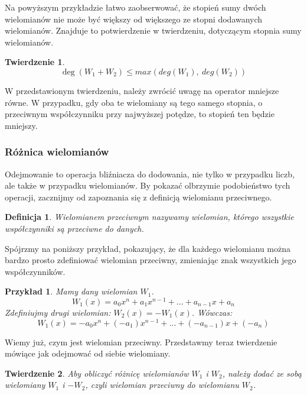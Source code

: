 \documentclass[twoside,a4paper]{book}
\newtheorem{theorem}{Twierdzenie}
\newtheorem{definition}{Definicja}
\newtheorem{example}{Przykład}
\begin{document}
Na powyższym przykładzie łatwo zaobserwować, że stopień sumy dwóch wielomianów nie może być większy od większego ze stopni dodawanych wielomianów. Znajduje to potwierdzenie w twierdzeniu, dotyczącym stopnia sumy wielomianów.

\begin{theorem}
	\begin{equation}
		\deg(W_1 + W_2) \le max(deg(W_1),\ deg (W_2))
	\end{equation}
\end{theorem}

W przedstawionym twierdzeniu, należy zwrócić uwagę na operator mniejsze równe. W przypadku, gdy oba te wielomiany są tego samego stopnia, o przeciwnym współczynniku przy najwyższej potędze, to stopień ten będzie mniejszy.

\subsubsection{Różnica wielomianów}

Odejmowanie to operacja bliźniacza do dodowania, nie tylko w przypadku liczb, ale także w przypadku wielomianów. By pokazać olbrzymie podobieństwo tych operacji, zacznijmy od zapoznania się z definicją wielomianu przeciwnego.

\begin{definition}
	Wielomianem przeciwnym nazywamy wielomian, którego wszystkie współczynniki są przeciwne do danych.
\end{definition}

Spójrzmy na poniższy przykład, pokazujący, że dla każdego wielomianu można bardzo prosto zdefiniować wielomian przeciwny, zmieniając znak wszystkich jego współczynników.

\begin{example}
	Mamy dany wielomian $W_1$.
	\begin{equation}
		W_1(x) = a_0x^n + a_1x^{n-1} + ... + a_{n-1}x + a_n
	\end{equation}
	Zdefiniujmy drugi wielomian: $W_2(x) = -W_1(x)$. Wówczas:
	\begin{equation}
		W_1(x) = -a_0x^n + (-a_1)x^{n-1} + ... + (-a_{n-1})x + (-a_n)
	\end{equation}
\end{example}

Wiemy już, czym jest wielomian przeciwny. Przedstawmy teraz twierdzenie mówiące jak odejmować od siebie wielomiany.

\begin{theorem}
	Aby obliczyć różnicę wielomianów $W_1$ i $W_2$, należy dodać ze sobą wielomiany $W_1$ i $-W_2$, czyli wielomian przeciwny do wielomianu $W_2$.
\end{theorem}
\end{document}
